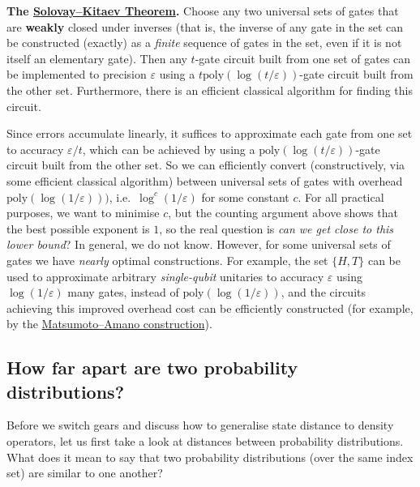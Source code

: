 \documentclass[fleqn,a4paper]{article}
\newenvironment{idea}{\everypar{\setlength{\parindent}{1.5em}}}{}
\theoremstyle{definition}
\theoremstyle{definition}
\theoremstyle{definition}
\theoremstyle{definition}
\theoremstyle{remark}
\begin{document}
\begin{idea}
\textbf{The \href{https://en.wikipedia.org/wiki/Solovay\%E2\%80\%93Kitaev_theorem}{Solovay--Kitaev Theorem}.}
Choose any two universal sets of gates that are \textbf{weakly} closed under inverses (that is, the inverse of any gate in the set can be constructed (exactly) as a \emph{finite} sequence of gates in the set, even if it is not itself an elementary gate).
Then any \(t\)-gate circuit built from one set of gates can be implemented to precision \(\varepsilon\) using a \(t\mathrm{poly}(\log(t/\varepsilon))\)-gate circuit built from the other set.
Furthermore, there is an efficient classical algorithm for finding this circuit.

\end{idea}

Since errors accumulate linearly, it suffices to approximate each gate from one set to accuracy \(\varepsilon/t\), which can be achieved by using a \(\mathrm{poly}(\log(t/\varepsilon))\)-gate circuit built from the other set.
So we can efficiently convert (constructively, via some efficient classical algorithm) between universal sets of gates with overhead \(\mathrm{poly}(\log(1/\varepsilon)))\), i.e.~\(\log^c(1/\varepsilon)\) for some constant \(c\).
For all practical purposes, we want to minimise \(c\), but the counting argument above shows that the best possible exponent is \(1\), so the real question is \emph{can we get close to this lower bound}?
In general, we do not know.
However, for some universal sets of gates we have \emph{nearly} optimal constructions.
For example, the set \(\{H,T\}\) can be used to approximate arbitrary \emph{single-qubit} unitaries to accuracy \(\varepsilon\) using \(\log(1/\varepsilon)\) many gates, instead of \(\mathrm{poly}(\log(1/\varepsilon))\), and the circuits achieving this improved overhead cost can be efficiently constructed (for example, by the \href{https://arxiv.org/abs/0806.3834}{Matsumoto--Amano construction}).

\hypertarget{how-far-apart-are-two-probability-distributions}{%
\subsection{How far apart are two probability distributions?}\label{how-far-apart-are-two-probability-distributions}}

Before we switch gears and discuss how to generalise state distance to density operators, let us first take a look at distances between probability distributions.
What does it mean to say that two probability distributions (over the same index set) are similar to one another?
\end{document}
